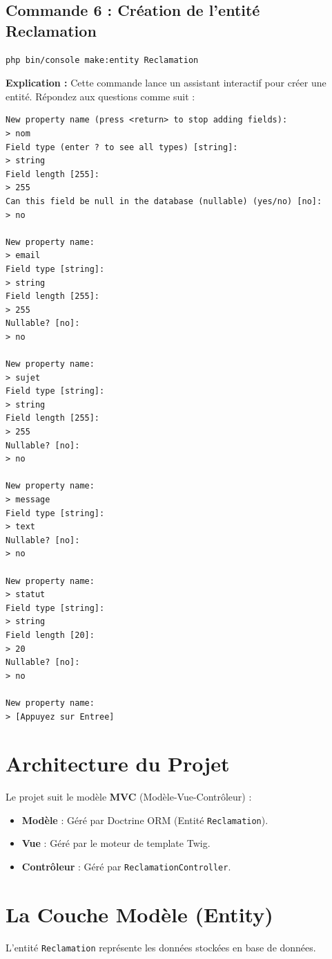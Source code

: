 \documentclass[12pt,a4paper]{article}
\begin{document}
\subsection{Commande 6 : Création de l'entité Reclamation}
\begin{lstlisting}[language=bash]
php bin/console make:entity Reclamation
\end{lstlisting}
\textbf{Explication :} Cette commande lance un assistant interactif pour créer une entité. Répondez aux questions comme suit :
\begin{lstlisting}
New property name (press <return> to stop adding fields):
> nom
Field type (enter ? to see all types) [string]:
> string
Field length [255]:
> 255
Can this field be null in the database (nullable) (yes/no) [no]:
> no

New property name:
> email
Field type [string]:
> string
Field length [255]:
> 255
Nullable? [no]:
> no

New property name:
> sujet
Field type [string]:
> string
Field length [255]:
> 255
Nullable? [no]:
> no

New property name:
> message
Field type [string]:
> text
Nullable? [no]:
> no

New property name:
> statut
Field type [string]:
> string
Field length [20]:
> 20
Nullable? [no]:
> no

New property name:
> [Appuyez sur Entree]
\end{lstlisting}

\section{Architecture du Projet}
Le projet suit le modèle \textbf{MVC} (Modèle-Vue-Contrôleur) :
\begin{itemize}
    \item \textbf{Modèle} : Géré par Doctrine ORM (Entité \texttt{Reclamation}).
    \item \textbf{Vue} : Géré par le moteur de template Twig.
    \item \textbf{Contrôleur} : Géré par \texttt{ReclamationController}.
\end{itemize}

\section{La Couche Modèle (Entity)}
L'entité \texttt{Reclamation} représente les données stockées en base de données.
\end{document}

